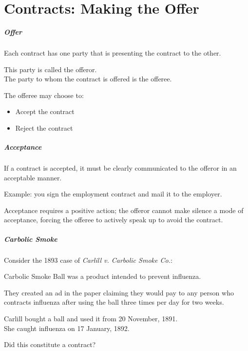 \part{Contracts: Making the Offer}
\begin{frame}
\partpage
\end{frame}



\begin{frame}
\frametitle{Offer}

Each contract has one party that is presenting the contract to the other.

This party is called the \alert{offeror}.\\
The party to whom the contract is offered is the \alert{offeree}.

The offeree may choose to:
\begin{itemize}
	\item Accept the contract
	\item Reject the contract
\end{itemize}

\end{frame}

\begin{frame}
\frametitle{Acceptance}

If a contract is accepted, it must be clearly communicated to the offeror in an acceptable manner.

Example: you sign the employment contract and mail it to the employer.

Acceptance requires a positive action; the offeror cannot make silence a mode of acceptance, forcing the offeree to actively speak up to avoid the contract.

\end{frame}

\begin{frame}
\frametitle{Carbolic Smoke}
Consider the 1893 case of \textit{Carlill v. Carbolic Smoke Co.}:

Carbolic Smoke Ball was a product intended to prevent influenza.

They created an ad in the paper claiming they would pay  to any person who contracts influenza after using the ball three times per day for two weeks.

Carlill bought a ball and used it from 20 November, 1891.\\
\quad She caught influenza on 17 January, 1892.

Did this constitute a contract?

\end{frame}


